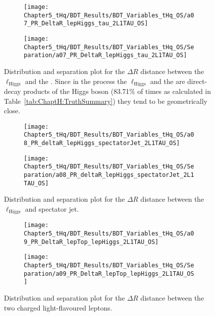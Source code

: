 \begin{figure}[h]
\centering
\begin{subfigure}{.45\textwidth}
  \centering
  \texttt{[image: Chapter5\_tHq/BDT\_Results/BDT\_Variables\_tHq\_OS/a07\_PR\_DeltaR\_lepHiggs\_tau\_2L1TAU\_OS]}
\end{subfigure}%
\begin{subfigure}{.55\textwidth}
  \centering
  \texttt{[image: Chapter5\_tHq/BDT\_Results/BDT\_Variables\_tHq\_OS/Separation/a07\_PR\_DeltaR\_lepHiggs\_tau\_2L1TAU\_OS]}
\end{subfigure}
\caption{Distribution and separation plot for the $\Delta R$ distance between the $\ell_{\text{Higgs}}$ and the \tauhad. 
Since in the \tHq process the $\ell_{\text{Higgs}}$ and the \tauhad are direct-decay products of the Higgs boson (83.71\% of times as calculated in Table~\ref{tab:ChaptH:TruthSummary})
they tend to be geometrically close.}
\label{fig:Appendix:BDTVARS:tHqOS:a07_PR_DeltaR_lepHiggs_tau}
\end{figure}

\begin{figure}[h]
\centering
\begin{subfigure}{.45\textwidth}
  \centering
  \texttt{[image: Chapter5\_tHq/BDT\_Results/BDT\_Variables\_tHq\_OS/a08\_PR\_deltaR\_lepHiggs\_spectatorJet\_2L1TAU\_OS]}
\end{subfigure}%
\begin{subfigure}{.55\textwidth}
  \centering
  \texttt{[image: Chapter5\_tHq/BDT\_Results/BDT\_Variables\_tHq\_OS/Separation/a08\_PR\_deltaR\_lepHiggs\_spectatorJet\_2L1TAU\_OS]}
\end{subfigure}
\caption{Distribution and separation plot for the $\Delta R$ distance between the $\ell_{\text{Higgs}}$ and
spectator jet. }
\label{fig:Appendix:BDTVARS:tHqOS:a08_PR_deltaR_lepHiggs_spectatorJet}
\end{figure}

\begin{figure}[h]
\centering
\begin{subfigure}{.45\textwidth}
  \centering
  \texttt{[image: Chapter5\_tHq/BDT\_Results/BDT\_Variables\_tHq\_OS/a09\_PR\_DeltaR\_lepTop\_lepHiggs\_2L1TAU\_OS]}
\end{subfigure}%
\begin{subfigure}{.55\textwidth}
  \centering
  \texttt{[image: Chapter5\_tHq/BDT\_Results/BDT\_Variables\_tHq\_OS/Separation/a09\_PR\_DeltaR\_lepTop\_lepHiggs\_2L1TAU\_OS]}
\end{subfigure}
\caption{Distribution and separation plot for the $\Delta R$ distance between the two charged light-flavoured leptons.}
\label{fig:Appendix:BDTVARS:tHqOS:a09_PR_DeltaR_lepTop_lepHiggs}
\end{figure}

